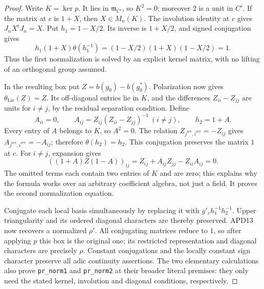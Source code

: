 \begin{proof}
Write \(K=\ker p\).  It lies in \(\mathfrak m_{C'}\), so
\(K^2=0\); moreover \(2\) is a unit in \(C'\).  If the
matrix at \(c\) is \(1+X\), then \(X\in M_n(K)\).
The involution identity at \(c\) gives
\(J_nX^tJ_n=X\).  Put \(h_1=1-X/2\).  Its inverse is
\(1+X/2\), and signed conjugation gives
\[
 h_1(1+X)\theta(h_1^{-1})
                 =(1-X/2)(1+X)(1-X/2)=1.                 \tag{APD.34}
\]
Thus the first normalization is solved by an explicit kernel
matrix, with no lifting of an orthogonal group assumed.

In the resulting box put \(Z=b(g_0)-b(g_0^*)\).  Polarization
now gives \(\theta_{\mathrm{Lie}}(Z)=Z\).  Its off-diagonal
entries lie in \(K\), and the differences \(Z_{ii}-Z_{jj}\)
are units for \(i\ne j\), by the residual separation condition.
Define
\[
 A_{ii}=0,\qquad A_{ij}=Z_{ij}(Z_{ii}-Z_{jj})^{-1}\ (i\ne j),
 \qquad h_2=1+A.                                         \tag{APD.35}
\]
Every entry of \(A\) belongs to \(K\), so \(A^2=0\).
The relation \(Z_{j^{\mathrm{rev}},i^{\mathrm{rev}}}=-Z_{ij}\)
gives \(A_{j^{\mathrm{rev}},i^{\mathrm{rev}}}=-A_{ij}\);
therefore \(\theta(h_2)=h_2\).  This conjugation preserves
the matrix \(1\) at \(c\).  For \(i\ne j\), expansion gives
\[
 ((1+A)Z(1-A))_{ij}
  =Z_{ij}+A_{ij}Z_{jj}-Z_{ii}A_{ij}=0.                    \tag{APD.36}
\]
The omitted terms each contain two entries of \(K\) and are
zero; this explains why the formula works over an arbitrary
coefficient algebra, not just a field.  It proves the second
normalization equation.

Conjugate each local basis simultaneously by replacing it with
\(g'_v h_1^{-1}h_2^{-1}\).  Upper triangularity and its
ordered diagonal characters are thereby preserved.  APD13 now
recovers a normalized \(\rho'\).  All conjugating matrices
reduce to \(1\), so after applying \(p\) this box is the
original one; its restricted representation and diagonal
characters are precisely \(\rho\).  Constant conjugations
and the locally constant sign character preserve all adic
continuity assertions.  The two elementary calculations also
prove \texttt{pr\_norm1} and \texttt{pr\_norm2} at their
broader literal premises: they only need the stated kernel,
involution and diagonal conditions, respectively.
\end{proof}

